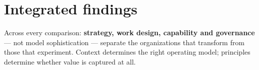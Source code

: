 \section{Integrated findings}

Across every comparison: \textbf{strategy, work design, capability and
governance} — not model sophistication — separate the organizations that
transform from those that experiment. Context determines the right operating
model; principles determine whether value is captured at all.

